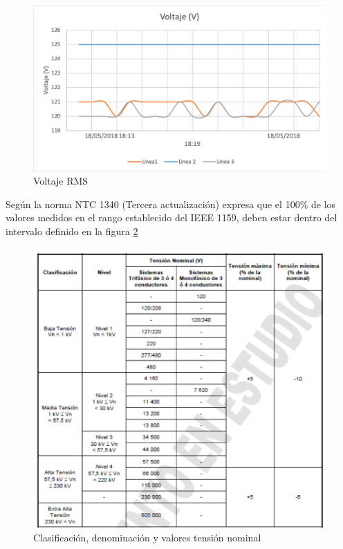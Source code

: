 \begin{figure}[H]
\centering
\includegraphics{2Marco/voltaje-rms}
\caption{Voltaje RMS} 
\label{fig:voltaje-rms}
\end{figure} 

Según la norma NTC 1340 (Tercera actualización) expresa que el 100\% de los valores medidos en el rango establecido del IEEE 1159, deben estar dentro del intervalo definido en la figura \ref{fig:tension-nominal}

\begin{figure}[H]
\centering
\includegraphics{2Marco/tension-nominal}
\caption{Clasificación, denominación y valores tensión nominal} 
\label{fig:tension-nominal}
\end{figure} 

